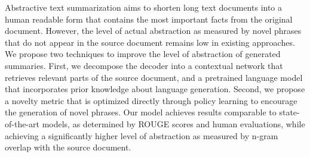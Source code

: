 Abstractive text summarization aims to shorten long text documents into a human readable form that contains the most important facts from the original document. However, the level of actual abstraction as measured by novel phrases that do not appear in the source document remains low in existing approaches. We propose two techniques to improve the level of abstraction of generated summaries. First, we decompose the decoder into a contextual network that retrieves relevant parts of the source document, and a pretrained language model that incorporates prior knowledge about language generation. Second, we propose a novelty metric that is optimized directly through policy learning to encourage the generation of novel phrases. Our model achieves results comparable to state-of-the-art models, as determined by ROUGE scores and human evaluations, while achieving a significantly higher level of abstraction as measured by n-gram overlap with the source document.
